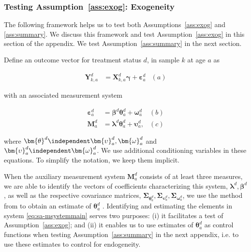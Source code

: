 \subsubsection{Testing Assumption~\ref{ass:exog}: Exogeneity} \label{app:endogeneity}

\noindent The following framework helps us to test both Assumptions~\ref{ass:exog} and \ref{ass:summary}. We discuss this framework and test Assumption~\ref{ass:exog} in this section of the appendix. We test Assumption~\ref{ass:summary} in the next section.

\noindent Define an outcome vector for treatment status $d$, in sample $k$ at age $a$ as

\begin{align}
\bm{Y}^d_{k,a} &= \bm{X}^d_{k,a} \bm{\gamma} + \bm{\varepsilon}^d_a  &(a) \nonumber
\end{align}

\noindent with an associated measurement system

\begin{align}  \label{eq:sa-msystemmain}
\bm{\varepsilon}_{a}^d &=\bm{\beta}^d \bm{\theta}_{a}^d + \bm{\omega}_{a}^d  &(b) \nonumber \\
\bm{M}_{a}^d &= \bm{\lambda}^d \bm{\theta}_{a}^d + \bm{\upsilon}_a^d,  &(c)
\end{align}


\noindent where $\bm{\theta}^d \independent \bm{\upsilon}_{a}^d, \bm{\omega}_{a}^d$ and $\bm{\upsilon}_{a}^d \independent \bm{\omega}_{a}^d$. We use additional conditioning variables in these equations. To simplify the notation, we keep them implicit.

\noindent When the auxiliary measurement system $\bm{M}_{a}^d $ consists of at least three measures, we are able to identify the vectors of coefficients characterizing this system, $\bm{\lambda}^d, \bm{\beta}^d$, as well as the respective covariance matrices, $\bm{\Sigma}_{\bm{\theta}_{a}^d}, \bm{\Sigma}_{\bm{\upsilon}_{a}^d}, \bm{\Sigma}_{\bm{\omega}_{a}^d}$, we use the method from \citet{Bartlett_1938_Nature} to obtain an estimate of $\bm{\theta}_{a}^d$ \citep{Heckman_Pinto_etal_2013_PerryFactor}. Identifying and estimating the elements in system \eqref{eq:sa-msystemmain} serves two purposes: (i) it facilitates a test of Assumption~\ref{ass:exog}; and (ii) it enables us to use estimates of $\bm{\theta}_{a}^d$ as control functions when testing Assumption~\ref{ass:summary} in the next appendix, i.e. to use these estimates to control for endogeneity.

